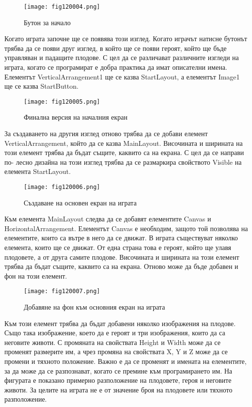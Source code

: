 \begin{figure}[H]
  \centering
  \texttt{[image: fig120004.png]}
  \caption{Бутон за начало}
\label{fig120004}
\end{figure}

Когато играта започне ще се появява този изглед. Когато играчът натисне бутонът трябва да се появи друг изглед, в който ще се появи героят, който ще бъде управляван и падащите плодове. С цел да се различават различните изгледи на играта, когато се програмират е добра практика да имат описателни имена. Елементът VerticalArrangement1 ще се казва StartLayout, а елементът Image1 ще се казва StartButton.

\begin{figure}[H]
  \centering
  \texttt{[image: fig120005.png]}
  \caption{Финална версия на началния екран}
\label{fig120005}
\end{figure}

За създаването на другия изглед отново трябва да се добави елемент VerticalArrangement, който да се казва MainLayout. Височината и ширината на този елемент трябва да бъдат същите, каквито са на екрана. С цел да се направи по- лесно дизайна на този изглед трябва да се размаркира свойството Visible на елемента StartLayout.

\begin{figure}[H]
  \centering
  \texttt{[image: fig120006.png]}
  \caption{Създаване на основен екран на играта}
\label{fig120006}
\end{figure}

Към елемента MainLayout следва да се добавят елементите Canvas и HorizontalArrangement.
Елементът Canvas е необходим, защото той позволява на елементите, които са вътре в него да се движат. В играта съществуват няколко елемента, които ще се движат. От една страна това е героят, който ще улавя плодовете, а от друга самите плодове.
Височината и ширината на този елемент трябва да бъдат същите, каквито са на екрана. Отново може да бъде добавен и фон на този елемент.

\begin{figure}[H]
  \centering
  \texttt{[image: fig120007.png]}
  \caption{Добавяне на фон към основния екран на играта}
\label{fig120007}
\end{figure}

Към този елемент трябва да бъдат добавени няколко изображения на плодове. Също така изображение, което да е героят и три изображения, които да са неговите животи. С промяната на свойствата Height и Width може да се променят размерите им, а чрез промяна на свойствата X, Y и Z може да се промени и тяхното положение. Важно е да се променят и имената на елементите, за да може да се разпознават, когато се премине към програмирането им.
На фигурата е показано примерно разположение на плодовете, героя и неговите животи. За целите на играта не е от значение броя на плодовете или тяхното разположение.

